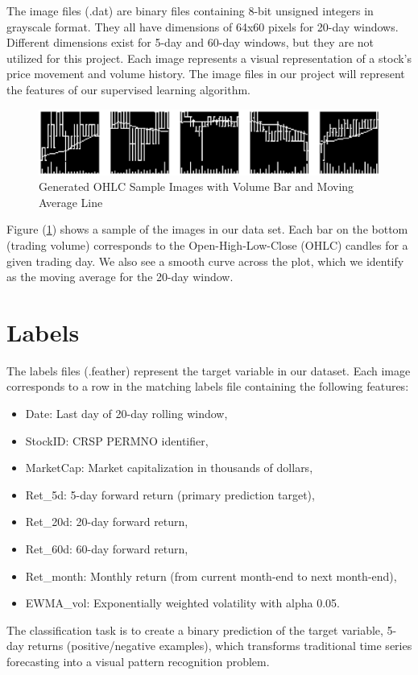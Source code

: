 \documentclass[12pt]{article}
\begin{document}
The image files (.dat) are binary files containing 8-bit unsigned integers in grayscale format. They all have dimensions of 64x60 pixels for 20-day windows. Different dimensions exist for 5-day and 60-day windows, but they are not utilized for this project. Each image represents a visual representation of a stock's price movement and volume history. The image files in our project will represent the features of our supervised learning algorithm.

\begin{figure}[h]
	\centering
	\includegraphics[width=1\linewidth]{plots/images.png}
	\caption{Generated OHLC Sample Images with Volume Bar and Moving Average Line}
	\label{fig:image}
\end{figure}

Figure (\ref{fig:image}) shows a sample of the images in our data set. Each bar on the bottom (trading volume) corresponds to the Open-High-Low-Close (OHLC) candles for a given trading day. We also see a smooth curve across the plot, which we identify as the moving average for the 20-day window.

\section*{Labels}

The labels files (.feather) represent the target variable in our dataset. Each image corresponds to a row in the matching labels file containing the following features:

\begin{itemize}
	\item Date: Last day of 20-day rolling window,
	\item StockID: CRSP PERMNO identifier,
	\item MarketCap: Market capitalization in thousands of dollars,
	\item Ret\_5d: 5-day forward return (primary prediction target),
	\item Ret\_20d: 20-day forward return,
	\item Ret\_60d: 60-day forward return,
	\item Ret\_month: Monthly return (from current month-end to next month-end),
	\item EWMA\_vol: Exponentially weighted volatility with alpha 0.05.
\end{itemize}
The classification task is to create a binary prediction of the target variable, 5-day returns (positive/negative examples), which transforms traditional time series forecasting into a visual pattern recognition problem.
\end{document}
